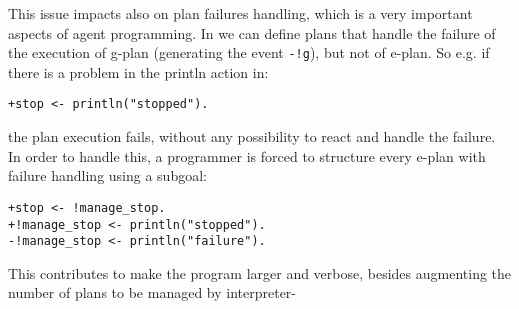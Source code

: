 %
%


This issue impacts also on plan failures handling, which is a very important aspects of agent programming.
%
In {\asl} we can define plans that handle the failure of the execution of g-plan (generating the event \texttt{-!g}), but not of e-plan.
%
So e.g. if there is a problem in the println action in:

\begin{small}
\begin{verbatim}
+stop <- println("stopped").
\end{verbatim}
\end{small}

\noindent the plan execution fails, without any possibility to react and handle the failure.
%
In order to handle this, a programmer is forced to structure every e-plan with failure handling using a subgoal:

\begin{small}
\begin{verbatim}
+stop <- !manage_stop.
+!manage_stop <- println("stopped").
-!manage_stop <- println("failure").
\end{verbatim}
\end{small}

\noindent This contributes to make the program larger and verbose, besides augmenting the number of plans to be managed by interpreter-

